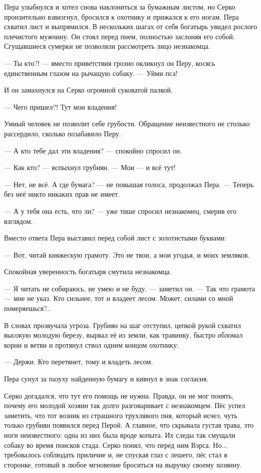 \documentclass[oneside,final,14pt]{extreport}
\begin{document}
	Пера улыбнулся и хотел снова наклониться за бумажным листом, но Серко пронзительно взвизгнул, бросился к охотнику и прижался к его ногам. Пера схватил лист и выпрямился. В нескольких шагах от себя богатырь увидел рослого плечистого мужчину. Он стоял перед пнем, полностью заслоняя его собой. Сгущавшиеся сумерки не позволяли рассмотреть лицо незнакомца.
	
	— Ты кто?! — вместо приветствия грозно окликнул он Перу, косясь единственным глазом на рычащую собаку. — Уйми пса!
	
	И он замахнулся на Серко огромной суковатой палкой.
	
	— Чего пришел?! Тут мои владения!
	
	Умный человек не позволит себе грубости. Обращение неизвестного не столько рассердило, сколько позабавило Перу.
	
	— А кто тебе дал эти владения? — спокойно спросил он.
	
	— Как кто? — вспыхнул грубиян. — Мои — и всё тут!
	
	— Нет, не всё. А где бумага? — не повышая голоса, продолжал Пера. — Теперь без неё никто никаких прав не имеет.
	
	— А у тебя она есть, что ли? — уже тише спросил незнакомец, смерив его взглядом.
	
	Вместо ответа Пера выставил перед собой лист с золотистыми буквами:
	
	— Вот, читай княжескую грамоту. Это не твои, а мои угодья, и моих земляков.
	
	Спокойная уверенность богатыря смутила незнакомца.
	
	— Я читать не собираюсь, не умею и не буду. — заметил он. — Так что грамота — мне не указ. Кто сильнее, тот и владеет лесом. Может, силами со мной померяешься?..
	
	В словах прозвучала угроза. Грубиян на шаг отступил, цепкой рукой схватил высокую молодую березу, вырвал её из земли, как травинку, быстро обломал корни и ветви и протянул ствол одним концом охотнику:
	
	— Держи. Кто перетянет, тому и владеть лесом.
	
	Пера сунул за пазуху найденную бумагу и кивнул в знак согласия.
	
	Серко догадался, что тут его помощь не нужна. Правда, он не мог понять, почему его молодой хозяин так долго разговаривает с незнакомцем. Пёс успел  заметить, что тот возник из страшного трухлявого пня, который исчез, чуть только грубиян появился перед Перой. А главное, что скрывала густая трава, это ноги неизвестного: одна из них была вроде копыта. Их следы так смущали собаку во время поисков стада. Серко понял, что перед ним Вэрса. Но... требовалось соблюдать приличие и, не спуская глаз с лешего, пёс стал в сторонке, готовый в любое мгновение броситься на выручку своему хозяину.
	
\end{document}
